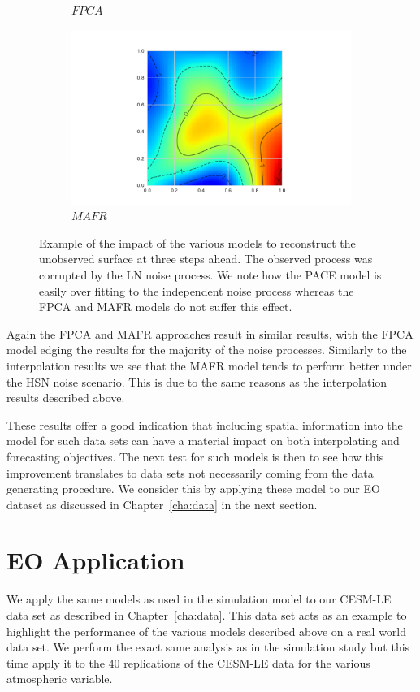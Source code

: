 \begin{figure}
\begin{subfigure}[b]{0.45\textwidth}
		\caption{$FPCA$}
		\label{fig:ftsm_res_recon_fpca}
	\end{subfigure}
	\begin{subfigure}[b]{0.45\textwidth}
		\includegraphics[width=\textwidth]{ftsm_res_recon_example_mafr}
		\caption{$MAFR$}
		\label{fig:ftsm_res_recon_mafr}
	\end{subfigure}  
	\caption[Example of the impact of the various models to reconstruct the unobserved surface at three steps ahead.]{Example of the impact of the various models to reconstruct the unobserved surface at three steps ahead. The observed process was corrupted by the LN noise process. We note how the PACE model is easily over fitting to the independent noise process whereas the FPCA and MAFR models do not suffer this effect.}
	\label{fig:ftsm_res_recon}
\end{figure}

Again the FPCA and MAFR approaches result in similar results, with the FPCA model edging the results for the majority of the noise processes.
Similarly to the interpolation results we see that the MAFR model tends to perform better under the HSN noise scenario. 
This is due to the same reasons as the interpolation results described above. 

These results offer a good indication that including spatial information into the model for such data sets can have a material impact on both interpolating and forecasting objectives. 
The next test for such models is then to see how this improvement translates to data sets not necessarily coming from the data generating procedure.
We consider this by applying these model to our EO dataset as discussed in Chapter~\ref{cha:data} in the next section. 

\section{EO Application \label{sec:ftsm_eo}}
We apply the same models as used in the simulation model to our CESM-LE data set as described in Chapter~\ref{cha:data}.
This data set acts as an example to highlight the performance of the various models described above on a real world data set. 
We perform the exact same analysis as in the simulation study but this time apply it to the $40$ replications of the CESM-LE data for the various atmospheric variable. 

